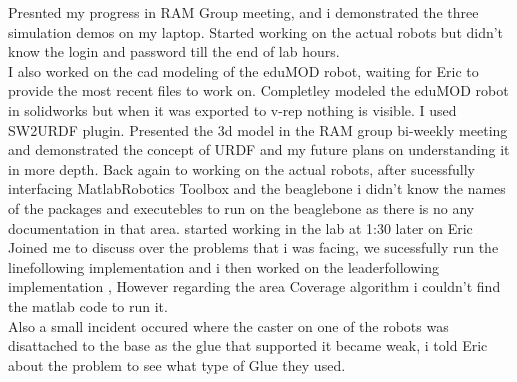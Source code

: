 \documentclass[fontsize=11pt, %
                             paper=letter, %
                             twoside, %
                             captions=tableheading,
                             index=totoc,
                             hyperref]{labbook}
\begin{document}
\begin{addmargin}[0cm]{0cm}
Presnted my progress in RAM Group meeting, and i demonstrated the three simulation demos on my laptop.
Started working on the actual robots but didn't know the login and password till the end of lab hours.
\\ I also worked on the cad modeling of the eduMOD robot, waiting for Eric to provide the most recent files to work on. 
Completley modeled the eduMOD robot in solidworks but when it was exported to v-rep nothing is visible. I used SW2URDF plugin.
Presented the 3d model in the RAM group bi-weekly meeting and demonstrated the concept of URDF and my future plans on understanding it in more depth. 
 Back again to working on the actual robots, after sucessfully interfacing MatlabRobotics Toolbox and the beaglebone i didn't know the names of the packages and executebles to run on the beaglebone as there is no any documentation in that area. 
 started working in the lab at 1:30 later on Eric Joined me to discuss over the problems that i was facing, we sucessfully run the linefollowing implementation and i then worked on the leaderfollowing implementation , However regarding the area Coverage algorithm i couldn't find the matlab code to run it. 
 \\ Also a small incident occured where the caster on one of the robots was disattached to the base as the glue that supported it became weak, i told Eric about the problem to see what type of Glue they used.

\end{addmargin}










\end{document}
